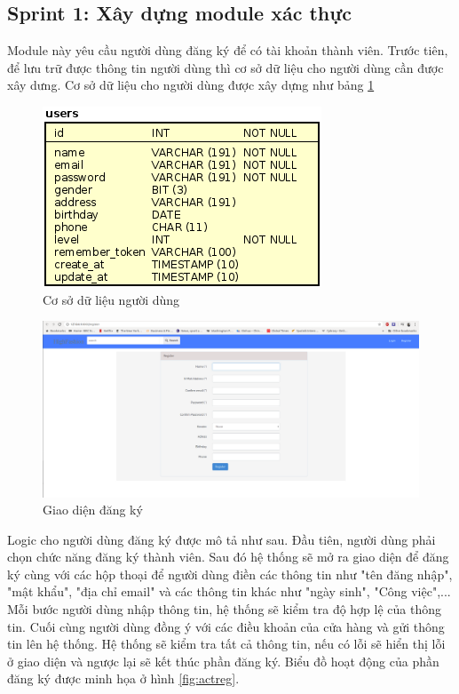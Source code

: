 \documentclass{article}
\begin{document}
\subsection{Sprint 1: Xây dựng module xác thực}

Module này yêu cầu người dùng đăng ký để có tài khoản thành viên. Trước tiên, để lưu trữ được thông tin người dùng thì cơ sở dữ liệu cho người dùng cần được xây dưng. Cơ sở dữ liệu cho người dùng được xây dựng như bảng \ref{fig:datareg}

\begin{figure}[h][h]
	\centering
	\includegraphics[scale=0.3]{figures/datareg.png}
	\caption{Cơ sở dữ liệu người dùng}
	\label{fig:datareg}
\end{figure}

\begin{figure}[h]
	\centering
	\includegraphics[scale=0.2]{figures/inreg.png}
	\caption{Giao diện đăng ký}
	\label{fig:inreg}
\end{figure}


Logic cho người dùng đăng ký được mô tả như sau. Đầu tiên, người dùng phải chọn chức năng đăng ký thành viên. Sau đó hệ thống sẽ mở ra giao diện để đăng ký cùng với các hộp thoại để người dùng điền các thông tin như "tên đăng nhập", "mật khẩu", "địa chỉ email" và các thông tin khác như "ngày sinh", "Công việc",... Mỗi bước người dùng nhập thông tin, hệ thống sẽ kiểm tra độ hợp lệ của thông tin. Cuối cùng người dùng đồng ý với các điều khoản của cửa hàng và gửi thông tin lên hệ thống. Hệ thống sẽ kiểm tra tất cả thông tin, nếu có lỗi sẽ hiển thị lỗi ở giao diện và ngược lại sẽ kết thúc phần đăng ký. Biểu đồ hoạt động của phần đăng ký được minh họa ở hình \ref{fig:actreg}.
\end{document}
